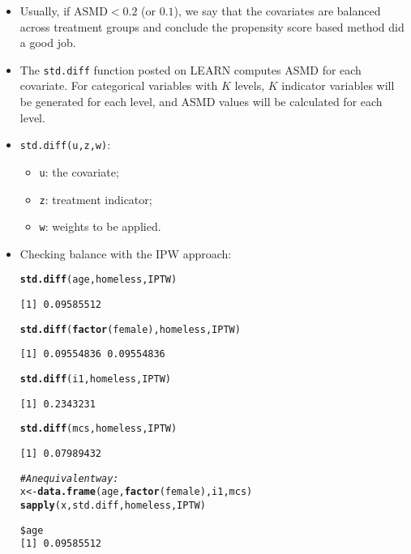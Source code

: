 \documentclass[oneside]{book}\usepackage[]{graphicx}\usepackage[svgnames]{xcolor}
\makeatletter
\newcommand{\hlcom}[1]{\textcolor[rgb]{0.678,0.584,0.686}{\textit{#1}}}%
\newcommand{\hlstd}[1]{\textcolor[rgb]{0.345,0.345,0.345}{#1}}%
\newcommand{\hlkwb}[1]{\textcolor[rgb]{0.69,0.353,0.396}{#1}}%
\newcommand{\hlkwd}[1]{\textcolor[rgb]{0.737,0.353,0.396}{\textbf{#1}}}%
\newenvironment{kframe}{%
 \def\at@end@of@kframe{}%
 \ifinner\ifhmode%
  \def\at@end@of@kframe{\end{minipage}}%
  \begin{minipage}{\columnwidth}%
 \fi\fi%
 \def\FrameCommand##1{\hskip\@totalleftmargin \hskip-\fboxsep
 \colorbox{shadecolor}{##1}\hskip-\fboxsep
     \hskip-\linewidth \hskip-\@totalleftmargin \hskip\columnwidth}%
 \MakeFramed {\advance\hsize-\width
   \@totalleftmargin\z@ \linewidth\hsize
   \@setminipage}}%
 {\par\unskip\endMakeFramed%
 \at@end@of@kframe}
\newenvironment{knitrout}{}{} %
\newcommand{\ASMD}{\text{ASMD}}%
\makeatother
\begin{document}
\begin{itemize}
      \item Usually, if $ \ASMD < 0.2 $ (or $0.1$), we say that the covariates
            are balanced across treatment groups and conclude the
            propensity score based method did a good job.
      \item The \texttt{std.diff} function posted on LEARN computes ASMD for
            each covariate. For categorical variables with $K$ levels, $K$
            indicator variables will be generated for each level, and ASMD
            values will be calculated for each level.
      \item \texttt{std.diff(u,z,w)}:
            \begin{itemize}
                  \item \texttt{u}: the covariate;
                  \item \texttt{z}: treatment indicator;
                  \item \texttt{w}: weights to be applied.
            \end{itemize}
      \item Checking balance with the IPW approach:
\begin{knitrout}
\color{fgcolor}\begin{kframe}
\begin{alltt}
\hlkwd{std.diff}\hlstd{(age, homeless, IPTW)}
\end{alltt}
\begin{verbatim}
[1] 0.09585512
\end{verbatim}
\begin{alltt}
\hlkwd{std.diff}\hlstd{(}\hlkwd{factor}\hlstd{(female), homeless, IPTW)}
\end{alltt}
\begin{verbatim}
[1] 0.09554836 0.09554836
\end{verbatim}
\begin{alltt}
\hlkwd{std.diff}\hlstd{(i1, homeless, IPTW)}
\end{alltt}
\begin{verbatim}
[1] 0.2343231
\end{verbatim}
\begin{alltt}
\hlkwd{std.diff}\hlstd{(mcs, homeless, IPTW)}
\end{alltt}
\begin{verbatim}
[1] 0.07989432
\end{verbatim}
\begin{alltt}
\hlcom{# An equivalent way:}
\hlstd{x} \hlkwb{<-} \hlkwd{data.frame}\hlstd{(age,} \hlkwd{factor}\hlstd{(female), i1, mcs)}
\hlkwd{sapply}\hlstd{(x, std.diff, homeless, IPTW)}
\end{alltt}
\begin{verbatim}
$age
[1] 0.09585512


\end{verbatim}
\end{kframe}
\end{knitrout}
\end{itemize}
\end{document}
